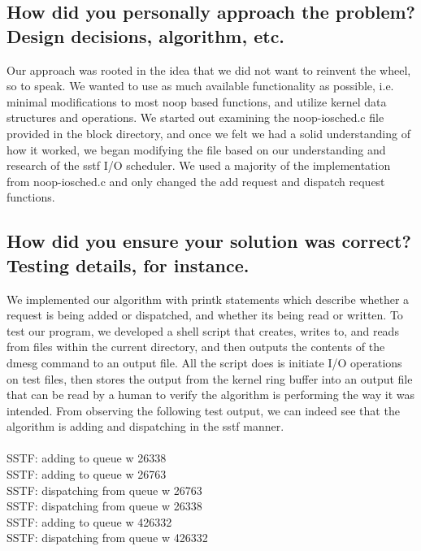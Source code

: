 \documentclass[onecolumn, draftclsnofoot,10pt, compsoc]{IEEEtran}
\begin{document}
\subsection{How did you personally approach the problem? Design decisions, algorithm, etc.}

\noindent 
Our approach was rooted in the idea that we did not want to reinvent the wheel, so to speak. We wanted to use as much available functionality as possible, i.e. minimal modifications to most noop based functions, and utilize kernel data structures and operations. We started out examining the noop-iosched.c file provided in the block directory, and once we felt we had a solid understanding of how it worked, we began modifying the file based on our understanding and research of the sstf I/O scheduler. We used a majority of the implementation from noop-iosched.c and only changed the add request and dispatch request functions. 
\\

\subsection{How did you ensure your solution was correct? Testing details, for instance.}
\noindent 
We implemented our algorithm with printk statements which describe whether a request is being added or dispatched, and whether its being read or written. To test our program, we developed a shell script that creates, writes to, and reads from files within the current directory, and then outputs the contents of the dmesg command to an output file. All the script does is initiate I/O operations on test files, then stores the output from the kernel ring buffer into an output file that can be read by a human to verify the algorithm is performing the way it was intended. From observing the following test output, we can indeed see that the algorithm is adding and dispatching in the sstf manner.\\
\\
\big[ 1546.038340\big] SSTF: adding to queue w 26338\\
\big[ 1546.038352\big] SSTF: adding to queue w 26763\\
\big[ 1546.038362\big] SSTF: dispatching from queue w 26763\\
\big[ 1546.038429\big] SSTF: dispatching from queue w 26338\\
\big[ 1546.038752\big] SSTF: adding to queue w 426332\\
\big[ 1546.038992\big] SSTF: dispatching from queue w 426332\\
\\
\end{document}
